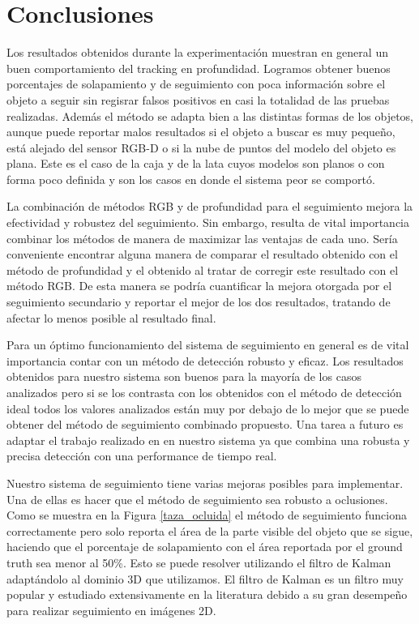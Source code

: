\chapter{Conclusiones}\label{chap:conclusiones}
Los resultados obtenidos durante la experimentación muestran en general un buen comportamiento del tracking en profundidad. Logramos obtener buenos porcentajes de solapamiento y de seguimiento con poca información sobre el objeto a seguir sin regisrar falsos positivos en casi la totalidad de las pruebas realizadas. Además el método se adapta bien a las distintas formas de los objetos, aunque puede reportar malos resultados si el objeto a buscar es muy pequeño, está alejado del sensor RGB-D o si la nube de puntos del modelo del objeto es plana. Este es el caso de la caja y de la lata cuyos modelos son planos o con forma poco definida y son los casos en donde el sistema peor se comportó.

La combinación de métodos RGB y de profundidad para el seguimiento mejora la efectividad y robustez del seguimiento. Sin embargo, resulta de vital importancia combinar los métodos de manera de maximizar las ventajas de cada uno. Sería conveniente encontrar alguna manera de comparar el resultado obtenido con el método de profundidad y el obtenido al tratar de corregir este resultado con el método RGB. De esta manera se podría cuantificar la mejora otorgada por el seguimiento secundario y reportar el mejor de los dos resultados, tratando de afectar lo menos posible al resultado final.

Para un óptimo funcionamiento del sistema de seguimiento en general es de vital importancia contar con un método de detección robusto y eficaz. Los resultados obtenidos para nuestro sistema son buenos para la mayoría de los casos analizados pero si se los contrasta con los obtenidos con el método de detección ideal todos los valores analizados están muy por debajo de lo mejor que se puede obtener del método de seguimiento combinado propuesto. Una tarea a futuro es adaptar el trabajo realizado en \cite{hinterstoisser2010dominant} en nuestro sistema ya que combina una robusta y precisa detección con una performance de tiempo real.

Nuestro sistema de seguimiento tiene varias mejoras posibles para implementar. Una de ellas es hacer que el método de seguimiento sea robusto a oclusiones. Como se muestra en la Figura \ref{taza_ocluida} el método de seguimiento funciona correctamente pero solo reporta el área de la parte visible del objeto que se sigue, haciendo que el porcentaje de solapamiento con el área reportada por el ground truth sea menor al 50\%. Esto se puede resolver utilizando el filtro de Kalman \cite{welch1995introduction} adaptándolo al dominio 3D que utilizamos. El filtro de Kalman es un filtro muy popular y estudiado extensivamente en la literatura \cite{julier1997new,wan2000unscented} debido a su gran desempeño para realizar seguimiento en imágenes 2D.

